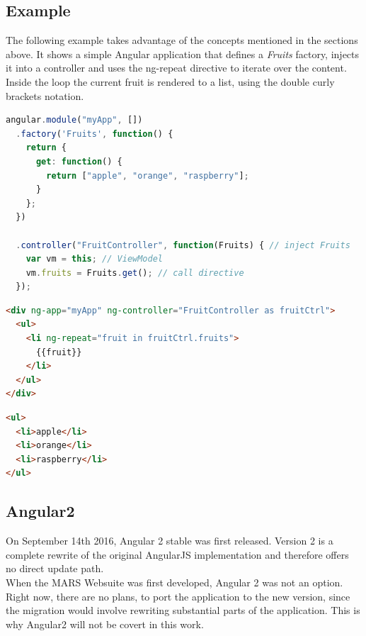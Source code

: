 \subsection{Example}
The following example takes advantage of the concepts mentioned in the sections above. It shows a simple Angular application that defines a \textit{Fruits} factory, injects it into a controller and uses the ng-repeat directive to iterate over the content. Inside the loop the current fruit is rendered to a list, using the double curly brackets notation.

\begin{lstlisting}[language=javascript, caption=AngularJS directive and controller definition, label=lst:angular]
angular.module("myApp", [])
  .factory('Fruits', function() {
    return {
      get: function() {
        return ["apple", "orange", "raspberry"];
      }
    };
  })
  
  .controller("FruitController", function(Fruits) { // inject Fruits
    var vm = this; // ViewModel
    vm.fruits = Fruits.get(); // call directive
  });
\end{lstlisting}

\begin{lstlisting}[language=html, caption=AngularJS template]
<div ng-app="myApp" ng-controller="FruitController as fruitCtrl">
  <ul>
    <li ng-repeat="fruit in fruitCtrl.fruits">
      {{fruit}}
    </li>
  </ul>
</div>
\end{lstlisting}

\begin{lstlisting}[language=html, caption=HTML result]
<ul>
  <li>apple</li>
  <li>orange</li>
  <li>raspberry</li>
</ul>
\end{lstlisting}


\subsection{Angular2}
On September 14th 2016, Angular 2 stable was first released. Version 2 is a complete rewrite of the original AngularJS implementation and therefore offers no direct update path.\\
When the MARS Websuite was first developed, Angular 2 was not an option. Right now, there are no plans, to port the application to the new version, since the migration would involve rewriting substantial parts of the application. This is why Angular2 will not be covert in this work.
